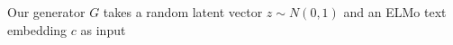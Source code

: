 Our generator $G$ takes a random latent vector $z \sim N(0, 1)$ and an ELMo text embedding $c$ as input